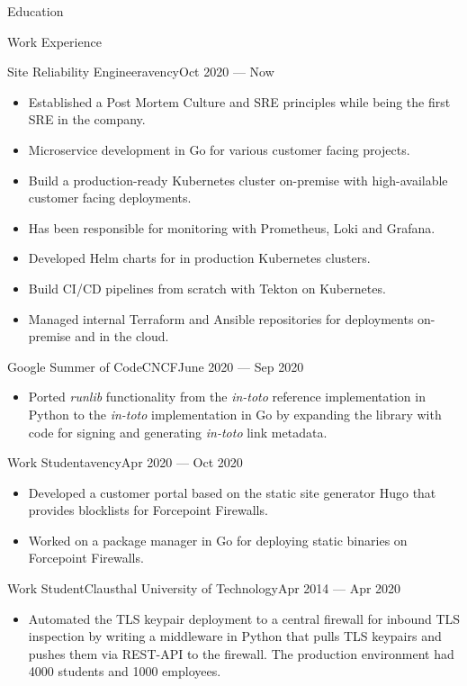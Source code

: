 \documentclass[]{mcdowellcv}
\begin{document}
\begin{cvsection}{Education}
\begin{cvsection}{Work Experience}
\begin{cvsubsection}{Site Reliability Engineer}{avency}{Oct 2020 --- Now}
\begin{itemize}
\item Established a Post Mortem Culture and SRE principles while being the first SRE in the company.
\item Microservice development in Go for various customer facing projects.
\item Build a production-ready Kubernetes cluster on-premise with high-available customer facing deployments.
\item Has been responsible for monitoring with Prometheus, Loki and Grafana.
\item Developed Helm charts for in production Kubernetes clusters.
\item Build CI/CD pipelines from scratch with Tekton on Kubernetes.
\item Managed internal Terraform and Ansible repositories for deployments on-premise and in the cloud.
\end{itemize}
\end{cvsubsection}
\begin{cvsubsection}{Google Summer of Code}{CNCF}{June 2020 --- Sep 2020}
\begin{itemize}
\item Ported \textit{runlib} functionality from the \textit{in-toto} reference implementation in Python to the \textit{in-toto} implementation in Go by expanding the library with code for signing and generating \textit{in-toto} link metadata.
\end{itemize}
\end{cvsubsection}
\begin{cvsubsection}{Work Student}{avency}{Apr 2020 --- Oct 2020}
\begin{itemize}
\item Developed a customer portal based on the static site generator Hugo that provides blocklists for Forcepoint Firewalls.
\item Worked on a package manager in Go for deploying static binaries on Forcepoint Firewalls.
\end{itemize}
\end{cvsubsection}
\begin{cvsubsection}{Work Student}{Clausthal University of Technology}{Apr 2014 --- Apr 2020}
\bigskip
\begin{itemize}
\item Automated the TLS keypair deployment to a central firewall for inbound TLS inspection by writing a middleware in Python that pulls TLS keypairs and pushes them via REST-API to the firewall. The production environment had 4000 students and 1000 employees.

\end{itemize}
\end{cvsubsection}
\end{cvsection}
\end{cvsection}
\end{document}
